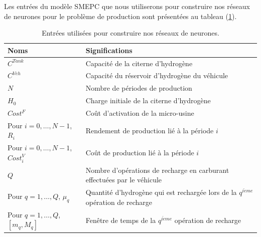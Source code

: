 Les entrées du modèle SMEPC que nous utiliserons pour construire nos réseaux de neurones pour le problème de production sont présentées au tableau (\ref{inputs_learn}).
\begin{table}[H]
	\centering
	\begin{tabular}{|*{2}{m{8cm}|}}
		\hline
		\rowcolor{cyan}	Noms & Significations\\
		\hline
		$C^{Tank}$ & Capacité de la citerne d'hydrogène\\
		\hline
		$C^{Veh}$  & Capacité du réservoir d'hydrogène du véhicule   \\
		\hline
		$N$  & Nombre de périodes de production    \\
		 \hline
		$H_0$  & Charge initiale de la citerne d'hydrogène \\
		\hline
		$Cost^F$  & Coût d'activation de la micro-usine \\
		\hline
		Pour $i=0, \dots, N-1$, $R_i$ &Rendement de production lié à la période $i$ \\
		\hline
		Pour $i=0, \dots, N-1$, $Cost_i^V$ &  Coût de production lié à la période $i$ \\
		\hline
		$Q$ & Nombre d'opérations de recharge en carburant effectuées par le véhicule \\
		\hline
		Pour $q=1, \dots, Q$, $\mu_q$ & Quantité d'hydrogène qui est rechargée lors de la $q^{i\grave eme}$ opération de recharge \\
		\hline
		Pour $q=1, \dots, Q$, $[m_q,M_q]$ & Fenêtre de temps de la $q^{i\grave eme}$ opération de recharge \\
		\hline
	\end{tabular}
	\caption[Entrées utilisées pour construire nos réseaux de neurones ]{Entrées utilisées pour construire nos réseaux de neurones. \label{inputs_learn}}
\end{table}

